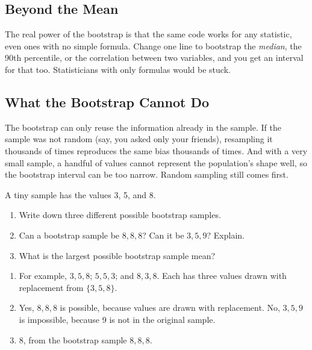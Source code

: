 \subsection{Beyond the Mean}
The real power of the bootstrap is that the same code works for any statistic, even ones with no
simple formula. Change one line to bootstrap the \emph{median}, the 90th percentile, or the
correlation between two variables, and you get an interval for that too. Statisticians with only
formulas would be stuck.

\subsection{What the Bootstrap Cannot Do}
The bootstrap can only reuse the information already in the sample. If the sample was not random
(say, you asked only your friends), resampling it thousands of times reproduces the same bias
thousands of times. And with a very small sample, a handful of values cannot represent the
population's shape well, so the bootstrap interval can be too narrow. Random sampling still comes
first.

\begin{Exercise}[title={Bootstrap Samples by Hand}, label=si_hand]
A tiny sample has the values 3, 5, and 8.
\begin{enumerate}
\item Write down three different possible bootstrap samples.
\item Can a bootstrap sample be $8, 8, 8$? Can it be $3, 5, 9$? Explain.
\item What is the largest possible bootstrap sample mean?
\end{enumerate}
\end{Exercise}
\begin{Answer}[ref=si_hand]
\begin{enumerate}
\item For example, $3, 5, 8$; $5, 5, 3$; and $8, 3, 8$. Each has three values drawn with replacement
from $\{3, 5, 8\}$.
\item Yes, $8, 8, 8$ is possible, because values are drawn with replacement. No, $3, 5, 9$ is
impossible, because 9 is not in the original sample.
\item 8, from the bootstrap sample $8, 8, 8$.
\end{enumerate}
\end{Answer}

